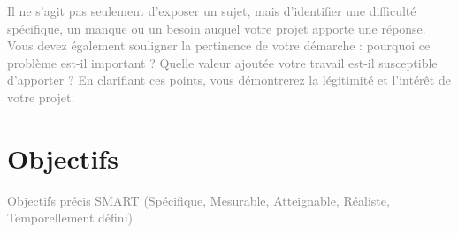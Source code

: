 \textcolor{gray}{Il ne s'agit pas seulement d'exposer un sujet, mais d'identifier une difficulté spécifique, un manque ou un besoin auquel votre projet apporte une réponse. Vous devez également souligner la pertinence de votre démarche : pourquoi ce problème est-il important ? Quelle valeur ajoutée votre travail est-il susceptible d'apporter ? En clarifiant ces points, vous démontrerez la légitimité et l'intérêt de votre projet.}



\section{Objectifs}

\textcolor{gray}{Objectifs précis SMART (Spécifique, Mesurable, Atteignable, Réaliste, Temporellement défini)}


